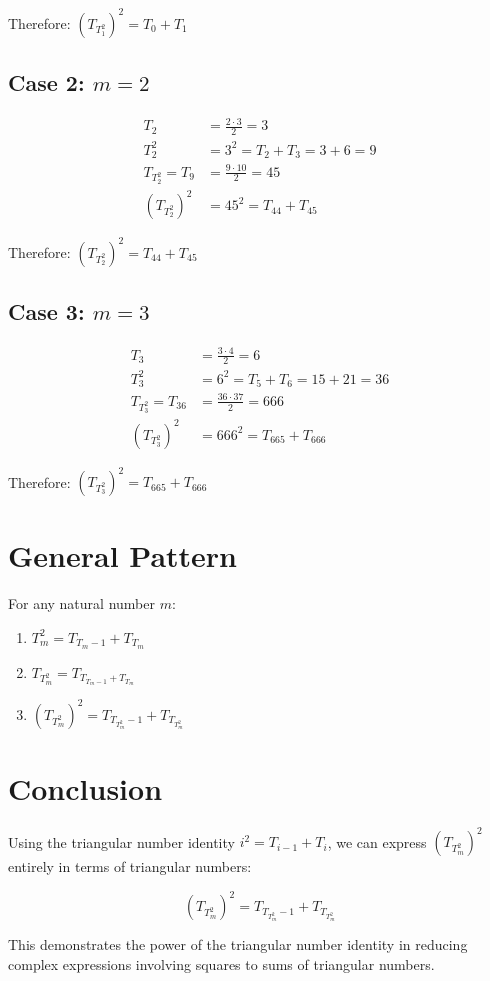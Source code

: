 \documentclass{article}
\begin{document}
Therefore: $(T_{T_1^2})^2 = T_0 + T_1$

\subsection{Case 2: $m = 2$}

\begin{align}
T_2 &= \frac{2 \cdot 3}{2} = 3 \\
T_2^2 &= 3^2 = T_2 + T_3 = 3 + 6 = 9 \\
T_{T_2^2} = T_9 &= \frac{9 \cdot 10}{2} = 45 \\
(T_{T_2^2})^2 &= 45^2 = T_{44} + T_{45}
\end{align}

Therefore: $(T_{T_2^2})^2 = T_{44} + T_{45}$

\subsection{Case 3: $m = 3$}

\begin{align}
T_3 &= \frac{3 \cdot 4}{2} = 6 \\
T_3^2 &= 6^2 = T_5 + T_6 = 15 + 21 = 36 \\
T_{T_3^2} = T_{36} &= \frac{36 \cdot 37}{2} = 666 \\
(T_{T_3^2})^2 &= 666^2 = T_{665} + T_{666}
\end{align}

Therefore: $(T_{T_3^2})^2 = T_{665} + T_{666}$

\section{General Pattern}

For any natural number $m$:

\begin{enumerate}
\item $T_m^2 = T_{T_m-1} + T_{T_m}$
\item $T_{T_m^2} = T_{T_{T_m-1} + T_{T_m}}$
\item $(T_{T_m^2})^2 = T_{T_{T_m^2}-1} + T_{T_{T_m^2}}$
\end{enumerate}

\section{Conclusion}

Using the triangular number identity $i^2 = T_{i-1} + T_i$, we can express $(T_{T_m^2})^2$ entirely in terms of triangular numbers:

\begin{equation}
(T_{T_m^2})^2 = T_{T_{T_m^2}-1} + T_{T_{T_m^2}}
\end{equation}

This demonstrates the power of the triangular number identity in reducing complex expressions involving squares to sums of triangular numbers.
\end{document}
